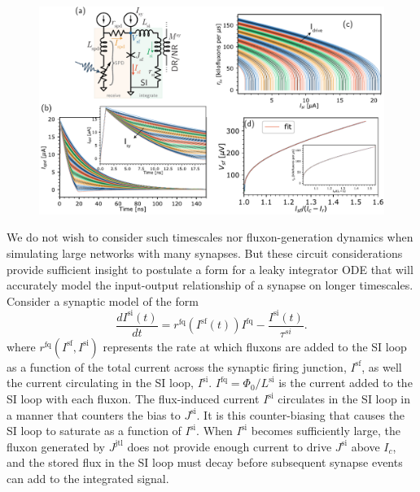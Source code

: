 \documentclass[twocolumn]{article}
\begin{document}
\begin{figure}[htb]
\includegraphics[width=17.2cm]{figures/_03__syn__1jj__circuit__rate_array.pdf}
\end{figure}
We do not wish to consider such timescales nor fluxon-generation dynamics when simulating large networks with many synapses. But these circuit considerations provide sufficient insight to postulate a form for a leaky integrator ODE that will accurately model the input-output relationship of a synapse on longer timescales. Consider a synaptic model of the form 
\begin{equation}
\label{eq:leaky_integrator__SI_loop}
\frac{dI^{\mathrm{si}}(t)}{dt} = r^{\mathrm{fq}}\left(I^{\mathrm{sf}}(t)\right) I^{\mathrm{fq}}-\frac{I^{\mathrm{si}}(t)}{\tau^{si}}.
\end{equation}
where $r^{\mathrm{fq}}(I^{\mathrm{sf}},I^{\mathrm{si}})$ represents the rate at which fluxons are added to the SI loop as a function of the total current across the synaptic firing junction, $I^{\mathrm{sf}}$, as well the current circulating in the SI loop, $I^{\mathrm{si}}$. $I^{\mathrm{fq}} = \Phi_0/L^{\mathrm{si}}$ is the current added to the SI loop with each fluxon. The flux-induced current $I^{\mathrm{si}}$ circulates in the SI loop in a manner that counters the bias to $J^{\mathrm{si}}$. It is this counter-biasing that causes the SI loop to saturate as a function of $I^{\mathrm{si}}$. When $I^{\mathrm{si}}$ becomes sufficiently large, the fluxon generated by $J^{\mathrm{jtl}}$ does not provide enough current to drive $J^{\mathrm{si}}$ above $I_c$, and the stored flux in the SI loop must decay before subsequent synapse events can add to the integrated signal.
\end{document}

